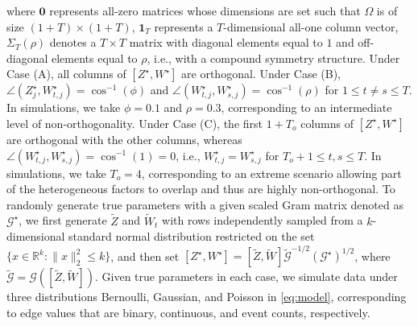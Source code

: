 \documentclass[12pt]{article}
\begin{document}
\noindent where  $\mathbf{0}$ represents all-zero matrices whose dimensions are set such that $\Omega$ is of size $(1+T)\times (1+T)$, $\mathbf{1}_T$ represents a $T$-dimensional all-one column vector,  $\Sigma_T(\rho)$ denotes a $T \times T$  matrix with diagonal elements equal to $1$ and off-diagonal elements equal to $\rho$, i.e., with a compound symmetry structure. 
Under Case (A), all columns of $[Z^\star,W^\star]$  are orthogonal. 
Under Case (B),
$\angle (Z_j^{\star}, W_{t,j}^{\star}) = \cos^{-1} (\phi)$ and  $\angle (W_{t,j}^{\star}, W_{s,j}^{\star}) = \cos^{-1} (\rho)$ for $1\leqslant t \neq s\leqslant T$. 
In simulations, 
we take $\phi = 0.1$ and $\rho = 0.3$, corresponding to an intermediate level of  non-orthogonality. 
Under Case (C),
the first $1+T_o$ columns of $[Z^{\star},W^{\star}]$ are orthogonal with the other columns, whereas 
$\angle (W_{t,j}^{\star}, W_{s,j}^{\star}) = \cos^{-1} (1) = 0$, i.e., $W_{t,j}^{\star}=W_{s,j}^{\star}$ for $T_o+1 \leqslant t,s\leqslant T$. In simulations, we take $T_o=4$, corresponding to an extreme scenario allowing part of the heterogeneous factors to overlap and thus are highly non-orthogonal.  
To randomly generate true parameters with a given scaled Gram matrix denoted as $\mathcal{G}^{\star}$, 
we first generate $\tilde {Z}$ and $\tilde {W}_t$ with rows independently sampled from a $k$-dimensional standard normal distribution restricted on the set $\{x \in \mathbb R^k: \|x\|_2^2 \leqslant k\}$, and  
 then set $[Z^\star, W^\star] = [\tilde Z, \tilde W] \tilde{\mathcal{G}}^{-1/2} (\mathcal{G}^\star)^{1/2}$, where $\tilde{\mathcal{G}} = \mathcal{G}([\tilde Z,\tilde W])$. 
Given true parameters in each case, we simulate data under three distributions Bernoulli, Gaussian, and Poisson in \eqref{eq:model}, corresponding to edge values that are binary, continuous, and event counts, respectively.  


\end{document}
